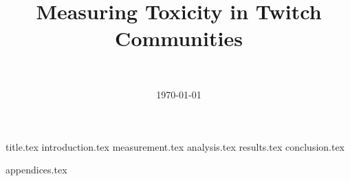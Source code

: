 \documentclass[final]{report}
\title{Measuring Toxicity in Twitch Communities}
\author{~}
\date{\today}
\begin{document}

{title.tex}
\newpage
{}\label{ch:contents}
\tableofcontents
\newpage
{}
{introduction.tex}
{measurement.tex}
{analysis.tex}
{results.tex}
{conclusion.tex}
\newpage
{}

\printbibliography
{appendices.tex}
\end{document}
